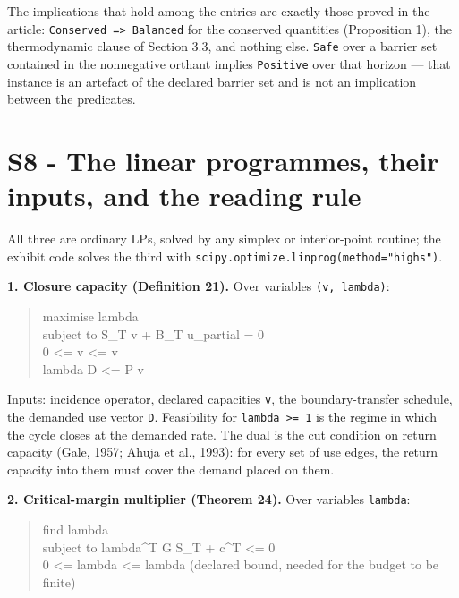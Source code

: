 \documentclass[11pt]{article}
\begin{document}
The implications that hold among the entries are exactly those proved in the article: \texttt{Conserved =>\allowbreak{} Balanced} for the conserved quantities (Proposition 1), the thermodynamic clause of Section 3.3, and nothing else. \texttt{Safe} over a barrier set contained in the nonnegative orthant implies \texttt{Positive} over that horizon --- that instance is an artefact of the declared barrier set and is not an implication between the predicates.

\vspace{0.8em}

\section*{S8 - The linear programmes, their inputs, and the reading rule}\label{s8---the-linear-programmes-their-inputs-and-the-reading-rule}

All three are ordinary LPs, solved by any simplex or interior-point routine; the exhibit code solves the third with \texttt{scipy.\allowbreak{}optimize.\allowbreak{}linprog(meth\allowbreak{}od="highs")}.

\textbf{1. Closure capacity (Definition 21).} Over variables \texttt{(v, lambda)}:

\begin{quote}\ttfamily\footnotesize\raggedright\setlength{\parskip}{0pt}
maximise   lambda\\
subject to S\_T v + B\_T u\_partial = 0\\
           0 <= v <= v\\
           lambda D <= P v
\end{quote}

Inputs: incidence operator, declared capacities \texttt{v}, the boundary-transfer schedule, the demanded use vector \texttt{D}. Feasibility for \texttt{lambda >= 1} is the regime in which the cycle closes at the demanded rate. The dual is the cut condition on return capacity (Gale, 1957; Ahuja et al., 1993): for every set of use edges, the return capacity into them must cover the demand placed on them.

\textbf{2. Critical-margin multiplier (Theorem 24).} Over variables \texttt{lambda}:

\begin{quote}\ttfamily\footnotesize\raggedright\setlength{\parskip}{0pt}
find   lambda\\
subject to lambda\textasciicircum{}T G S\_T + c\textasciicircum{}T <= 0\\
           0 <= lambda <= lambda        (declared bound, needed for the budget to be finite)
\end{quote}
\end{document}
